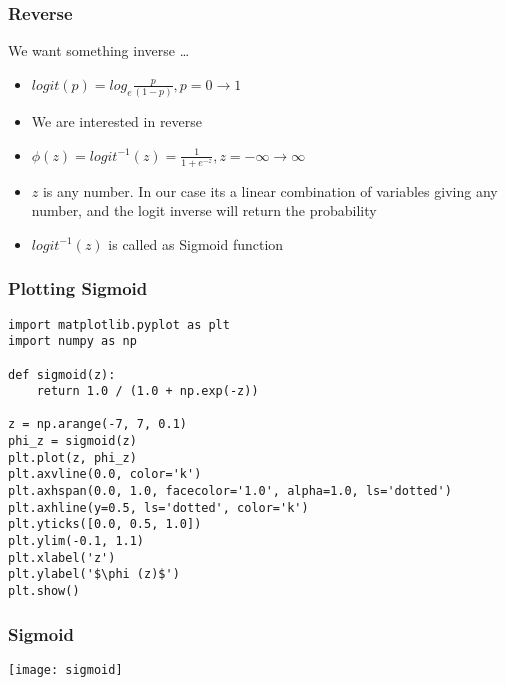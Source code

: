 \begin{frame}[fragile]\frametitle{Reverse}
We want something inverse \ldots
 \begin{itemize}
\item $logit(p) = log_e \frac{p}{(1-p)}, p = 0 \rightarrow 1$
\item We are interested in reverse

\item $\phi(z) = logit^{-1}(z) = \frac{1}{1+ e^{-z}}, z = -\infty \rightarrow \infty$
\item $z$ is any number. In our case its a linear combination of variables giving any number, and the logit inverse will return the probability
\item $logit^{-1}(z)$ is called as Sigmoid function
\end{itemize}
\end{frame}

\begin{frame}[fragile]\frametitle{Plotting Sigmoid}
 \begin{lstlisting}
import matplotlib.pyplot as plt
import numpy as np

def sigmoid(z):
	return 1.0 / (1.0 + np.exp(-z))
	
z = np.arange(-7, 7, 0.1)
phi_z = sigmoid(z)
plt.plot(z, phi_z)
plt.axvline(0.0, color='k')
plt.axhspan(0.0, 1.0, facecolor='1.0', alpha=1.0, ls='dotted')
plt.axhline(y=0.5, ls='dotted', color='k')
plt.yticks([0.0, 0.5, 1.0])
plt.ylim(-0.1, 1.1)
plt.xlabel('z')
plt.ylabel('$\phi (z)$')
plt.show() 
\end{lstlisting}
\end{frame}

\begin{frame}[fragile]\frametitle{Sigmoid}
\begin{center}
\texttt{[image: sigmoid]}
\end{center}
\end{frame}

